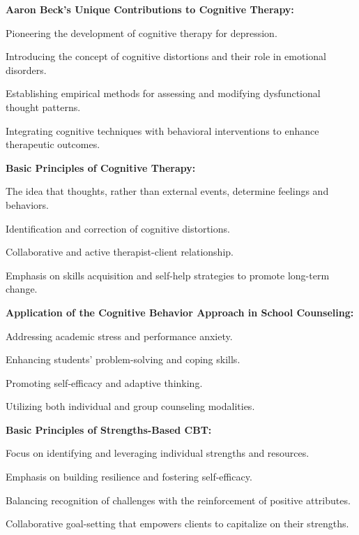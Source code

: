 \begin{coloredlist}
    \item \textbf{Aaron Beck's Unique Contributions to Cognitive Therapy:}
    \begin{coloredlist}
        \item Pioneering the development of cognitive therapy for depression.
        \item Introducing the concept of cognitive distortions and their role in emotional disorders.
        \item Establishing empirical methods for assessing and modifying dysfunctional thought patterns.
        \item Integrating cognitive techniques with behavioral interventions to enhance therapeutic outcomes.
    \end{coloredlist}

    \item \textbf{Basic Principles of Cognitive Therapy:}
    \begin{coloredlist}
        \item The idea that thoughts, rather than external events, determine feelings and behaviors.
        \item Identification and correction of cognitive distortions.
        \item Collaborative and active therapist-client relationship.
        \item Emphasis on skills acquisition and self-help strategies to promote long-term change.
    \end{coloredlist}

    \item \textbf{Application of the Cognitive Behavior Approach in School Counseling:}
    \begin{coloredlist}
        \item Addressing academic stress and performance anxiety.
        \item Enhancing students' problem-solving and coping skills.
        \item Promoting self-efficacy and adaptive thinking.
        \item Utilizing both individual and group counseling modalities.
    \end{coloredlist}

    \item \textbf{Basic Principles of Strengths-Based CBT:}
    \begin{coloredlist}
        \item Focus on identifying and leveraging individual strengths and resources.
        \item Emphasis on building resilience and fostering self-efficacy.
        \item Balancing recognition of challenges with the reinforcement of positive attributes.
        \item Collaborative goal-setting that empowers clients to capitalize on their strengths.
    \end{coloredlist}


\end{coloredlist}
